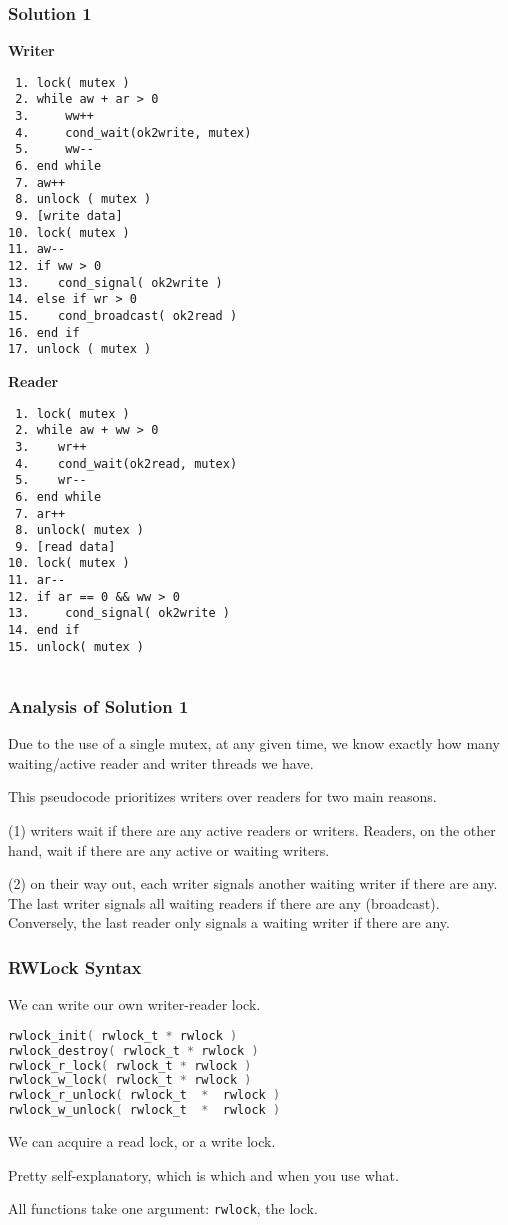 \begin{frame}[fragile]
	\frametitle{Solution 1}

	\begin{multicols}{2}
		\small
		\textbf{Writer}
		\begin{verbatim}
 1. lock( mutex )
 2. while aw + ar > 0
 3.     ww++
 4.     cond_wait(ok2write, mutex)
 5.     ww--
 6. end while
 7. aw++
 8. unlock ( mutex )
 9. [write data]
10. lock( mutex )
11. aw--
12. if ww > 0
13.    cond_signal( ok2write )
14. else if wr > 0
15.    cond_broadcast( ok2read )
16. end if
17. unlock ( mutex )
		\end{verbatim}
		\columnbreak
		\textbf{Reader}
		\begin{verbatim}
 1. lock( mutex )
 2. while aw + ww > 0
 3.    wr++
 4.    cond_wait(ok2read, mutex)
 5.    wr--
 6. end while
 7. ar++
 8. unlock( mutex )
 9. [read data]
10. lock( mutex )
11. ar--
12. if ar == 0 && ww > 0
13.     cond_signal( ok2write )
14. end if
15. unlock( mutex )


		\end{verbatim}
	\end{multicols}
	\vspace{-2em}

\end{frame}


\begin{frame}[fragile]
	\frametitle{Analysis of Solution 1}
	Due to the use of a single mutex, at any given time, we know exactly how many waiting/active reader and writer threads we have.

	This pseudocode prioritizes writers over readers for two main reasons.

	(1) writers wait if there are any active readers or writers.
	Readers, on the other hand, wait if there are any active or waiting writers.


	(2) on their way out, each writer signals another waiting writer if there are any.
	The last writer signals all waiting readers if there are any (broadcast).
	Conversely, the last reader only signals a waiting writer if there are any.
\end{frame}

\begin{frame}[fragile]
	\frametitle{RWLock Syntax}

	We can write our own writer-reader lock.

	\begin{lstlisting}[language=C]
rwlock_init( rwlock_t * rwlock )
rwlock_destroy( rwlock_t * rwlock )
rwlock_r_lock( rwlock_t * rwlock )
rwlock_w_lock( rwlock_t * rwlock )
rwlock_r_unlock( rwlock_t  *  rwlock )
rwlock_w_unlock( rwlock_t  *  rwlock )
	\end{lstlisting}

	We can acquire a read lock, or a write lock.

	Pretty self-explanatory, which is which and when you use what.

	All functions take one argument: \texttt{rwlock}, the lock.
\end{frame}


